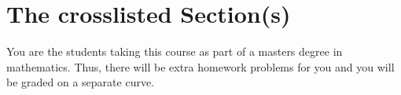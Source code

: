 \section*{The crosslisted \qu{\sixhundredsection} Section(s)}

You are the students taking this course as part of a masters degree in mathematics. Thus, there will be extra homework problems for you and you will be graded on a separate curve.